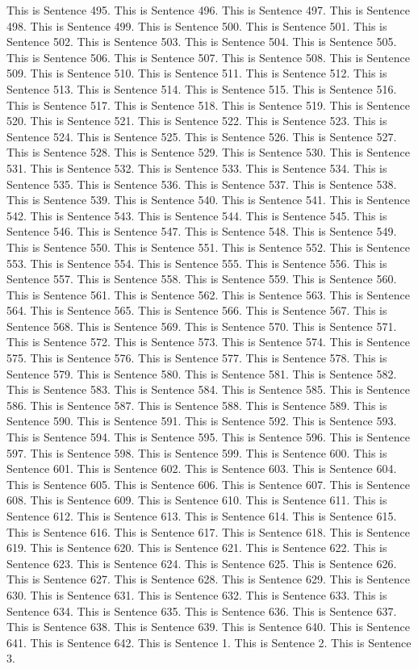 \documentclass{article}
\begin{document}
This is Sentence 495.
This is Sentence 496.
This is Sentence 497.
This is Sentence 498.
This is Sentence 499.
This is Sentence 500.
This is Sentence 501.
This is Sentence 502.
This is Sentence 503.
This is Sentence 504.
This is Sentence 505.
This is Sentence 506.
This is Sentence 507.
This is Sentence 508.
This is Sentence 509.
This is Sentence 510.
This is Sentence 511.
This is Sentence 512.
This is Sentence 513.
This is Sentence 514.
This is Sentence 515.
This is Sentence 516.
This is Sentence 517.
This is Sentence 518.
This is Sentence 519.
This is Sentence 520.
This is Sentence 521.
This is Sentence 522.
This is Sentence 523.
This is Sentence 524.
This is Sentence 525.
This is Sentence 526.
This is Sentence 527.
This is Sentence 528.
This is Sentence 529.
This is Sentence 530.
This is Sentence 531.
This is Sentence 532.
This is Sentence 533.
This is Sentence 534.
This is Sentence 535.
This is Sentence 536.
This is Sentence 537.
This is Sentence 538.
This is Sentence 539.
This is Sentence 540.
This is Sentence 541.
This is Sentence 542.
This is Sentence 543.
This is Sentence 544.
This is Sentence 545.
This is Sentence 546.
This is Sentence 547.
This is Sentence 548.
This is Sentence 549.
This is Sentence 550.
This is Sentence 551.
This is Sentence 552.
This is Sentence 553.
This is Sentence 554.
This is Sentence 555.
This is Sentence 556.
This is Sentence 557.
This is Sentence 558.
This is Sentence 559.
This is Sentence 560.
This is Sentence 561.
This is Sentence 562.
This is Sentence 563.
This is Sentence 564.
This is Sentence 565.
This is Sentence 566.
This is Sentence 567.
This is Sentence 568.
This is Sentence 569.
This is Sentence 570.
This is Sentence 571.
This is Sentence 572.
This is Sentence 573.
This is Sentence 574.
This is Sentence 575.
This is Sentence 576.
This is Sentence 577.
This is Sentence 578.
This is Sentence 579.
This is Sentence 580.
This is Sentence 581.
This is Sentence 582.
This is Sentence 583.
This is Sentence 584.
This is Sentence 585.
This is Sentence 586.
This is Sentence 587.
This is Sentence 588.
This is Sentence 589.
This is Sentence 590.
This is Sentence 591.
This is Sentence 592.
This is Sentence 593.
This is Sentence 594.
This is Sentence 595.
This is Sentence 596.
This is Sentence 597.
This is Sentence 598.
This is Sentence 599.
This is Sentence 600.
This is Sentence 601.
This is Sentence 602.
This is Sentence 603.
This is Sentence 604.
This is Sentence 605.
This is Sentence 606.
This is Sentence 607.
This is Sentence 608.
This is Sentence 609.
This is Sentence 610.
This is Sentence 611.
This is Sentence 612.
This is Sentence 613.
This is Sentence 614.
This is Sentence 615.
This is Sentence 616.
This is Sentence 617.
This is Sentence 618.
This is Sentence 619.
This is Sentence 620.
This is Sentence 621.
This is Sentence 622.
This is Sentence 623.
This is Sentence 624.
This is Sentence 625.
This is Sentence 626.
This is Sentence 627.
This is Sentence 628.
This is Sentence 629.
This is Sentence 630.
This is Sentence 631.
This is Sentence 632.
This is Sentence 633.
This is Sentence 634.
This is Sentence 635.
This is Sentence 636.
This is Sentence 637.
This is Sentence 638.
This is Sentence 639.
This is Sentence 640.
This is Sentence 641.
This is Sentence 642.
This is Sentence 1.
This is Sentence 2.
This is Sentence 3.
\end{document}
